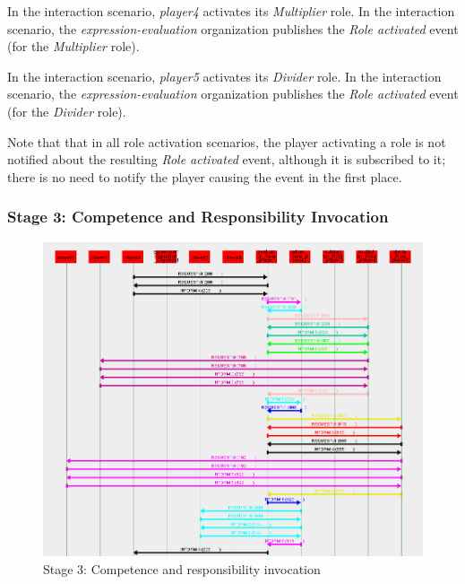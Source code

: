 In the {} interaction scenario, \textit{player4} activates its \textit{Multiplier} role.
In the {} interaction scenario, the \textit{expression-evaluation} organization publishes the \textit{Role activated} event (for the \textit{Multiplier} role).

In the {} interaction scenario, \textit{player5} activates its \textit{Divider} role.
In the {} interaction scenario, the \textit{expression-evaluation} organization publishes the \textit{Role activated} event (for the \textit{Divider} role).

Note that that in all role activation scenarios, the player activating a role is not notified about the resulting \textit{Role activated} event, although it is subscribed to it; there is no need to notify the player causing the event in the first place.

\subsubsection*{Stage 3: Competence and Responsibility Invocation}

\begin{figure}[H]
	\centering
	\includegraphics[width=\textwidth]{images/examples/example2-stage3.png}
	\caption{Stage 3: Competence and responsibility invocation}
	\label{figure:example2-stage3}
\end{figure}

